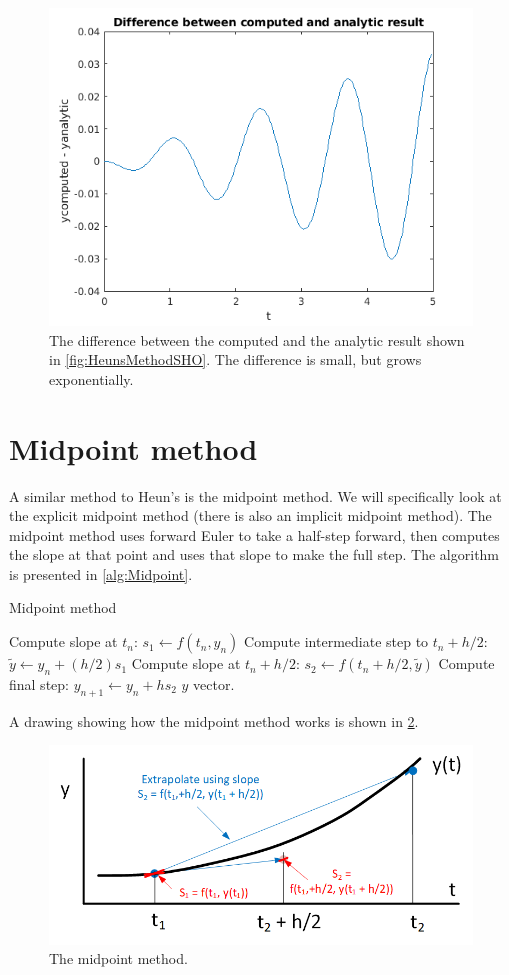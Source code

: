\documentclass[hidelinks,notitlepage]{book}
\begin{document}
\begin{figure}[tbh]
	\centering
	\includegraphics[width=0.7\columnwidth]{HeunsMethodSHODiff.png}
	\caption{The difference between the computed and the analytic result shown in \cref{fig:HeunsMethodSHO}. The difference is small, but grows exponentially.}
		\label{fig:HeunsMethodSHODiff}
	\end{figure}


\section{Midpoint method}
A similar method to Heun's is the midpoint method.  We will specifically look at the explicit midpoint method (there is also an implicit midpoint method).  The midpoint method uses forward Euler to take a half-step forward, then computes the slope at that point and uses that slope to make the full step.  The algorithm is presented in \cref{alg:Midpoint}.
\begin{algorithm}
	\caption{Midpoint method}
	\label{alg:Midpoint}
	\begin{algorithmic} 
		\STATE Compute slope at $t_n$: $s_1 \leftarrow f(t_n, y_n)$
		\STATE Compute intermediate step to $t_{n} + h/2$: $\tilde{y} \leftarrow y_n + (h/2) s_1$
		\STATE Compute slope at $t_{n} + h/2$: $s_2 \leftarrow f(t_{n}+h/2, \tilde{y})$
		\STATE Compute final step: $y_{n+1} \leftarrow y_n + h s_2$
		\ENDFOR
		\RETURN $y$ vector.
	\end{algorithmic}
\end{algorithm}
A drawing showing how the midpoint method works is shown in \cref{fig:MidpointMethod1}.
\begin{figure}[tbh]
	\centering
	\includegraphics[width=0.7\columnwidth]{MidpointMethod1.png}
	\caption{The midpoint method.}
	\label{fig:MidpointMethod1}
\end{figure}
\end{document}
